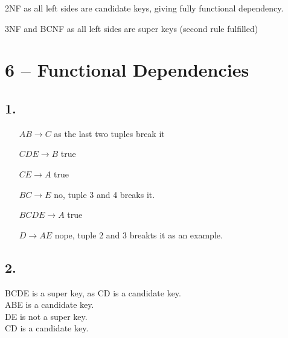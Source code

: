 \documentclass[10pt,a4paper,final]{report}
\begin{document}
2NF as all left sides are candidate keys, giving fully functional dependency.

3NF and BCNF as all left sides are super keys (second rule fulfilled)

\section*{6 -- Functional Dependencies}
\subsection*{1.}

\begin{itemize}
     \item[$AB \rightarrow C$] as the last two tuples break it
     \item[$CDE \rightarrow B$] true
     \item[$CE \rightarrow A$] true
     \item[$BC \rightarrow E$] no, tuple 3 and 4 breaks it.
     \item[$BCDE \rightarrow A$] true
     \item[$D \rightarrow AE$] nope, tuple 2 and 3 breakts it as an example.
\end{itemize}

\subsection*{2.}
BCDE is a super key, as CD is a candidate key.\\
ABE is a candidate key.\\
DE is not a super key.\\
CD is a candidate key.
\end{document}
